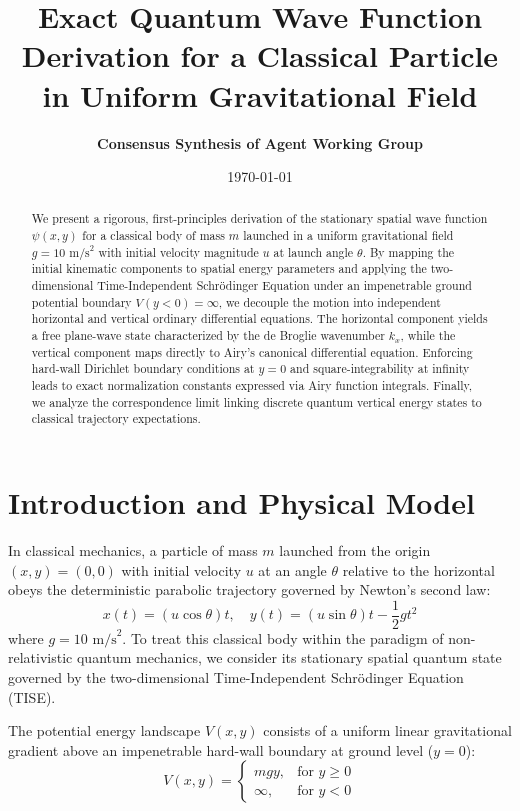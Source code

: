 \documentclass[11pt, a4paper]{article}
\title{\textbf{Exact Quantum Wave Function Derivation for a Classical Particle in Uniform Gravitational Field}}
\author{\textbf{Consensus Synthesis of Agent Working Group}}
\date{\today}
\begin{document}
\maketitle

\begin{abstract}
We present a rigorous, first-principles derivation of the stationary spatial wave function $\psi(x,y)$ for a classical body of mass $m$ launched in a uniform gravitational field $g = 10\text{ m/s}^2$ with initial velocity magnitude $u$ at launch angle $\theta$. By mapping the initial kinematic components to spatial energy parameters and applying the two-dimensional Time-Independent Schrödinger Equation under an impenetrable ground potential boundary $V(y < 0) = \infty$, we decouple the motion into independent horizontal and vertical ordinary differential equations. The horizontal component yields a free plane-wave state characterized by the de Broglie wavenumber $k_x$, while the vertical component maps directly to Airy's canonical differential equation. Enforcing hard-wall Dirichlet boundary conditions at $y=0$ and square-integrability at infinity leads to exact normalization constants expressed via Airy function integrals. Finally, we analyze the correspondence limit linking discrete quantum vertical energy states to classical trajectory expectations.
\end{abstract}

\section{Introduction and Physical Model}

In classical mechanics, a particle of mass $m$ launched from the origin $(x, y) = (0, 0)$ with initial velocity $u$ at an angle $\theta$ relative to the horizontal obeys the deterministic parabolic trajectory governed by Newton's second law:
\begin{equation}
x(t) = (u \cos\theta) t, \quad y(t) = (u \sin\theta) t - \frac{1}{2} g t^2
\end{equation}
where $g = 10\text{ m/s}^2$. To treat this classical body within the paradigm of non-relativistic quantum mechanics, we consider its stationary spatial quantum state governed by the two-dimensional Time-Independent Schrödinger Equation (TISE).

The potential energy landscape $V(x,y)$ consists of a uniform linear gravitational gradient above an impenetrable hard-wall boundary at ground level ($y = 0$):
\begin{equation}
V(x, y) = \begin{cases} 
mgy, & \text{for } y \ge 0 \\ 
\infty, & \text{for } y < 0 
\end{cases}
\end{equation}
\end{document}
